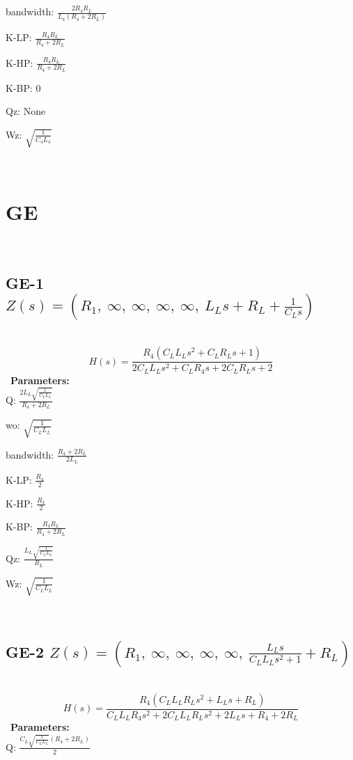 \documentclass{article}
\begin{document}
bandwidth: $\frac{2 R_{4} R_{L}}{L_{4} \left(R_{4} + 2 R_{L}\right)}$\ 

K-LP: $\frac{R_{4} R_{L}}{R_{4} + 2 R_{L}}$\ 

K-HP: $\frac{R_{4} R_{L}}{R_{4} + 2 R_{L}}$\ 

K-BP: $0$\ 

Qz: $\text{None}$\ 

Wz: $\sqrt{\frac{1}{C_{4} L_{4}}}$\ 

\ 

\section{GE}\ 
\subsection{GE-1 $Z(s) = \left( R_{1}, \  \infty, \  \infty, \  \infty, \  \infty, \  L_{L} s + R_{L} + \frac{1}{C_{L} s}\right)$ } \ 
\textbf{\[H(s) = \frac{R_{4} \left(C_{L} L_{L} s^{2} + C_{L} R_{L} s + 1\right)}{2 C_{L} L_{L} s^{2} + C_{L} R_{4} s + 2 C_{L} R_{L} s + 2}\] } \ 
\textbf{Parameters:}\\ 

Q: $\frac{2 L_{L} \sqrt{\frac{1}{C_{L} L_{L}}}}{R_{4} + 2 R_{L}}$\ 

wo: $\sqrt{\frac{1}{C_{L} L_{L}}}$\ 

bandwidth: $\frac{R_{4} + 2 R_{L}}{2 L_{L}}$\ 

K-LP: $\frac{R_{4}}{2}$\ 

K-HP: $\frac{R_{4}}{2}$\ 

K-BP: $\frac{R_{4} R_{L}}{R_{4} + 2 R_{L}}$\ 

Qz: $\frac{L_{L} \sqrt{\frac{1}{C_{L} L_{L}}}}{R_{L}}$\ 

Wz: $\sqrt{\frac{1}{C_{L} L_{L}}}$\ 

\ 

\subsection{GE-2 $Z(s) = \left( R_{1}, \  \infty, \  \infty, \  \infty, \  \infty, \  \frac{L_{L} s}{C_{L} L_{L} s^{2} + 1} + R_{L}\right)$ } \ 
\textbf{\[H(s) = \frac{R_{4} \left(C_{L} L_{L} R_{L} s^{2} + L_{L} s + R_{L}\right)}{C_{L} L_{L} R_{4} s^{2} + 2 C_{L} L_{L} R_{L} s^{2} + 2 L_{L} s + R_{4} + 2 R_{L}}\] } \ 
\textbf{Parameters:}\\ 

Q: $\frac{C_{L} \sqrt{\frac{1}{C_{L} L_{L}}} \left(R_{4} + 2 R_{L}\right)}{2}$\ 
\end{document}
